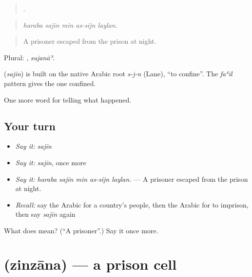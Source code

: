 \begin{quote}
    .
\end{quote}

\begin{quote}
\emph{haraba sajīn min as-sijn laylan.}
\end{quote}

\begin{quote}
A prisoner escaped from the prison at night.
\end{quote}

Plural: , \emph{sujanāʾ}.

\begin{cousinweb}
\textbf{} (\emph{sajīn}) is built on the native Arabic root \emph{s-j-n} (Lane), \textquotedblleft{}to confine\textquotedblright{}. The \emph{faʿīl} pattern gives the one confined.
\end{cousinweb}

\begin{grammarlens}[title={What you've built}]
One more word for telling what happened.
\end{grammarlens}

\subsection*{Your turn}
\begin{itemize}
\raggedright
  \item \emph{Say it:} \emph{sajīn}
  \item \emph{Say it:} \emph{sajīn}, once more
  \item \emph{Say it:} \emph{haraba sajīn min as-sijn laylan.} — A prisoner escaped from the prison at night.
  \item \emph{Recall:} say the Arabic for a country’s people, then the Arabic for to imprison, then say \emph{sajīn} again
\end{itemize}

\begin{tcolorbox}[breakable,colback=teal!4,colframe=teal!35!black,title={Before you move on}]
What does  mean? (\textquotedblleft{}A prisoner\textquotedblright{}.) Say it once more.
\end{tcolorbox}
\section[\texorpdfstring{\ar{زنزانة} (zinzāna)}{زنزانة (zinzāna)}]{ (zinzāna) — a prison cell}

